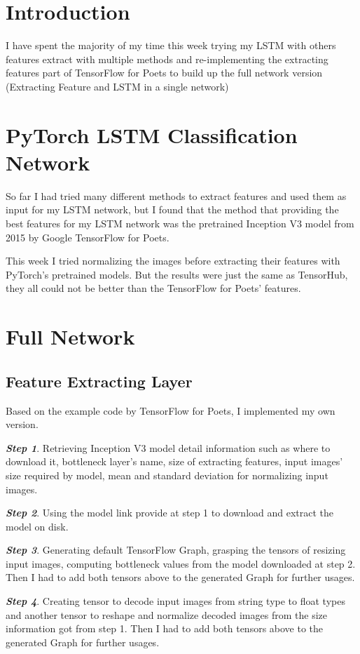 \section{Introduction}
I have spent the majority of my time this week trying my LSTM with others features extract with multiple methods and re-implementing the extracting features part of TensorFlow for Poets to build up the full network version (Extracting Feature and LSTM in a single network)

\section{PyTorch LSTM Classification Network}
So far I had tried many different methods to extract features and used them as input for my LSTM network, but I found that the method that providing the best features for my LSTM network was the pretrained Inception V3 model from 2015 by Google TensorFlow for Poets.

This week I tried normalizing the images before extracting their features with PyTorch's pretrained models. But the results were just the same as TensorHub, they all could not be better than the TensorFlow for Poets' features.

\section{Full Network}
\subsection{Feature Extracting Layer}
Based on the example code by TensorFlow for Poets, I implemented my own version.

\textbf{\emph{Step 1}}. Retrieving Inception V3 model detail information such as where to download it, bottleneck layer's name, size of extracting features, input images' size required by model, mean and standard deviation for normalizing input images.

\textbf{\emph{Step 2}}. Using the model link provide at step 1 to download and extract the model on disk.

\textbf{\emph{Step 3}}. Generating default TensorFlow Graph\cite{tfgraph}, grasping the tensors of resizing input images, computing bottleneck values from the model downloaded at step 2. Then I had to add both tensors above to the generated Graph for further usages.

\textbf{\emph{Step 4}}. Creating tensor to decode input images from string type to float types and another tensor to reshape and normalize decoded images from the size information got from step 1. Then I had to add both tensors above to the generated Graph for further usages.

